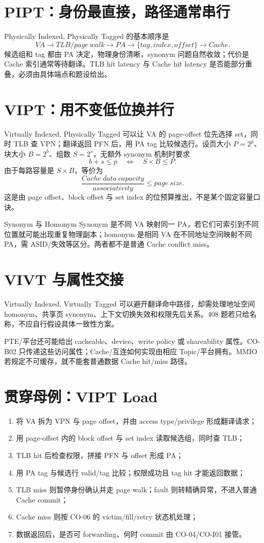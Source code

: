 \documentclass[UTF8,fontset=fandol,11pt,a4paper]{ctexart}
\begin{document}
\section{PIPT：身份最直接，路径通常串行}
Physically Indexed, Physically Tagged 的基本顺序是
\[
VA\to TLB/page\ walk\to PA\to \{tag,index,offset\}\to Cache.
\]
候选组和 tag 都由 PA 决定，物理身份清晰，synonym 问题自然收敛；代价是 Cache 索引通常等待翻译。TLB hit latency 与 Cache hit latency 是否能部分重叠，必须由具体端点和题设给出。

\section{VIPT：用不变低位换并行}
Virtually Indexed, Physically Tagged 可以让 VA 的 page-offset 位先选择 set，同时 TLB 查 VPN；翻译返回 PFN 后，用 PA tag 比较候选行。设页大小 $P=2^p$、块大小 $B=2^b$、组数 $S=2^s$，无额外 synonym 机制时要求
\[
b+s\le p
\quad\Longleftrightarrow\quad
S\times B\le P.
\]
由于每路容量是 $S\times B$，等价为
\[
\frac{Cache\ data\ capacity}{associativity}\le page\ size.
\]
这是由 page offset、block offset 与 set index 的位预算推出，不是某个固定容量口诀。

\begin{warnbox}{Synonym 与 Homonym}
Synonym 是不同 VA 映射同一 PA，若它们可索引到不同位置就可能出现重复物理副本；homonym 是相同 VA 在不同地址空间映射不同 PA，需 ASID/失效等区分。两者都不是普通 Cache conflict miss。
\end{warnbox}

\section{VIVT 与属性交接}
Virtually Indexed, Virtually Tagged 可以避开翻译命中路径，却需处理地址空间 homonym、共享页 synonym、上下文切换失效和权限先后关系。408 题若只给名称，不应自行假设具体一致性方案。

PTE/平台还可能给出 cacheable、device、write policy 或 shareability 属性。CO-B02 只传递这些访问属性；Cache/互连如何实现由相应 Topic/平台拥有。MMIO 若规定不可缓存，就不能套普通数据 Cache hit/miss 路径。

\section{贯穿母例：VIPT Load}
\begin{enumerate}
\item 将 VA 拆为 VPN 与 page offset，并由 access type/privilege 形成翻译请求；
\item 用 page-offset 内的 block offset 与 set index 读取候选组，同时查 TLB；
\item TLB hit 后检查权限，拼接 PFN 与 offset 形成 PA；
\item 用 PA tag 与候选行 valid/tag 比较；权限成功且 tag hit 才能返回数据；
\item TLB miss 则暂停身份确认并走 page walk；fault 则转精确异常，不进入普通 Cache commit；
\item Cache miss 则按 CO-06 的 victim/fill/retry 状态机处理；
\item 数据返回后，是否可 forwarding、何时 commit 由 CO-04/CO-I01 接管。
\end{enumerate}
\end{document}
